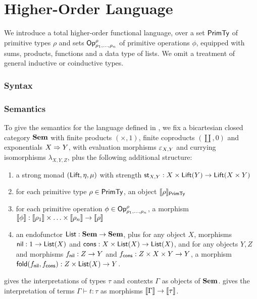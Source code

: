 \section{Higher-Order Language}
\label{sec:language}

We introduce a total higher-order functional language, over a set $\mathsf{PrimTy}$ of primitive types $\rho$ and sets
$\mathsf{Op}^\rho_{\rho_1,\ldots,\rho_n}$ of primitive operations $\phi$, equipped with sums, products, functions
and a data type of lists. We omit a treatment of general inductive or coinductive types.

\subsubsection{Syntax}
\label{sec:language:syntax}




\subsubsection{Semantics}
\label{sec:language:semantics}



To give the semantics for the language defined in , we fix a bicartesian closed
category $\mathbf{Sem}$ with finite products $(\times, 1)$, finite coproducts $(\coprod, 0)$ and exponentials
$X \Rightarrow Y$, with evaluation morphisms $\varepsilon_{X,Y}$ and currying isomorphisms $\lambda_{X,Y,Z}$,
plus the following additional structure:
\begin{enumerate}
\item a strong monad $(\mathsf{Lift}, \eta, \mu)$ with strength $\mathsf{st}_{X,Y}: X \times \mathsf{Lift}(Y) \to \mathsf{Lift}(X
\times Y)$
\item for each primitive type $\rho \in \mathsf{PrimTy}$, an object $\llbracket \rho \rrbracket_{\mathsf{PrimTy}}$
\item for each primitive operation $\phi \in \mathsf{Op}^\rho_{\rho_1,\ldots,\rho_n}$, a morphism $\llbracket \phi \rrbracket:
\llbracket \rho_1 \rrbracket \times \ldots \times \llbracket \rho_n \rrbracket \to \llbracket \rho \rrbracket$
\item an endofunctor $\mathsf{List}: \mathbf{Sem} \to \mathbf{Sem}$, plus for any object $X$, morphisms $\mathsf{nil}: 1 \to \mathsf{List}(X)$ and
$\mathsf{cons}: X \times \mathsf{List}(X) \to \mathsf{List}(X)$, and for any objects $Y, Z$ and morphisms $f_{\mathsf{nil}}: Z \to Y$ and
$f_{\mathsf{cons}}: Z \times X \times Y \to Y$, a morphism $\mathsf{fold}(f_{\mathsf{nil}},f_{\mathsf{cons}}): Z \times \mathsf{List}(X) \to Y$.
\end{enumerate}

 gives the interpretations of types $\tau$ and contexts $\Gamma$ as objects of $\mathbf{Sem}$.
 gives the interpretation of terms $\Gamma \vdash t: \tau$ as morphisms $\llbracket \Gamma \rrbracket
\to \llbracket \tau \rrbracket$.
